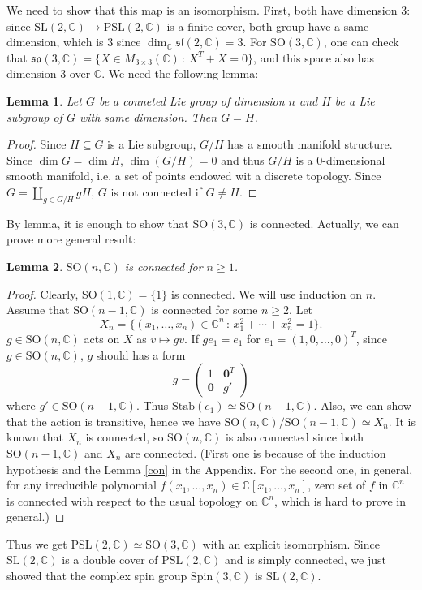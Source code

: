 \documentclass{article}
\newtheorem{lemma}{Lemma}
\newcommand{\PSL}{\mathrm{PSL}}
\newcommand{\SO}{\mathrm{SO}}
\newcommand{\SL}{\mathrm{SL}}
\newcommand{\Spin}{\mathrm{Spin}}
\begin{document}
We need to show that this map is an isomorphism. First, both have dimension 3: since $\SL(2, \mathbb{C})\to \PSL(2, \mathbb{C})$ is a finite cover, both group have a same dimension, which is 3 since $\dim_{\mathbb{C}} \mathfrak{sl}(2, \mathbb{C}) = 3$. 
For $\SO(3, \mathbb{C})$, one can check that $\mathfrak{so}(3, \mathbb{C}) = \{X\in M_{3\times 3}(\mathbb{C})\,:\, X^{T}+X = 0\}$, and this space also has dimension 3 over $\mathbb{C}$. 
We need the following lemma:
\begin{lemma}
Let $G$ be a conneted Lie group of dimension $n$ and $H$ be a Lie subgroup of $G$ with same dimension. 
Then $G = H$. 
\end{lemma}
\begin{proof}
Since $H\subseteq G$ is a Lie subgroup, $G/H$ has a smooth manifold structure. Since $\dim G = \dim H$, $\dim (G/H) = 0$ and thus $G/H$ is a $0$-dimensional smooth manifold, i.e. a set of points endowed wit a discrete topology. 
Since $G = \coprod_{g\in G/H} gH$, $G$ is not connected if $G\neq H$. 
\end{proof}
By lemma, it is enough to show that $\SO(3, \mathbb{C})$ is connected. Actually, we can prove more general result:
\begin{lemma}
$\SO(n, \mathbb{C})$ is connected for $n\geq 1$. 
\end{lemma}
\begin{proof}
Clearly, $\SO(1, \mathbb{C}) = \{1\}$ is connected. We will use induction on $n$. Assume that $\SO(n-1, \mathbb{C})$ is connected for some $n\geq 2$. Let 
$$
X_n = \{(x_{1}, \dots, x_{n})\in \mathbb{C}^{n}\,:\, x_{1}^{2} + \cdots + x_{n}^{2}= 1\}. 
$$
$g\in \SO(n, \mathbb{C})$ acts on $X$ as $v\mapsto gv$. 
If $ge_{1} = e_{1}$ for $e_{1} = (1, 0, \dots, 0)^{T}$, since $g\in \SO(n, \mathbb{C})$, $g$ should has a form 
$$
g = \begin{pmatrix} 1 & \mathbf{0}^{T} \\ \mathbf{0} & g'\end{pmatrix}
$$
where $g'\in \SO(n-1, \mathbb{C})$. Thus $\mathrm{Stab}(e_{1})\simeq \SO(n-1, \mathbb{C})$. 
Also, we can show that the action is transitive, hence we have $\SO(n, \mathbb{C})/\SO(n-1, \mathbb{C})\simeq X_{n}$. 
It is known that $X_{n}$ is connected, so $\SO(n, \mathbb{C})$ is also connected since both $\SO(n-1, \mathbb{C})$ and $X_{n}$ are connected.  (First one is because of the induction hypothesis and the Lemma \ref{con} in the Appendix. For the second one, in general, for any irreducible polynomial $f(x_{1}, \dots, x_{n})\in \mathbb{C}[x_{1}, \dots, x_{n}]$, zero set of $f$ in $\mathbb{C}^{n}$ is connected with respect to the usual topology on $\mathbb{C}^{n}$, which is hard to prove in general.)
\end{proof}
Thus we get $\PSL(2, \mathbb{C})\simeq \SO(3, \mathbb{C})$ with an explicit isomorphism. 
Since $\SL(2, \mathbb{C})$ is a double cover of $\PSL(2, \mathbb{C})$ and is simply connected, we just showed that the complex spin group $\Spin(3, \mathbb{C})$ is $\SL(2, \mathbb{C})$. 
\end{document}
